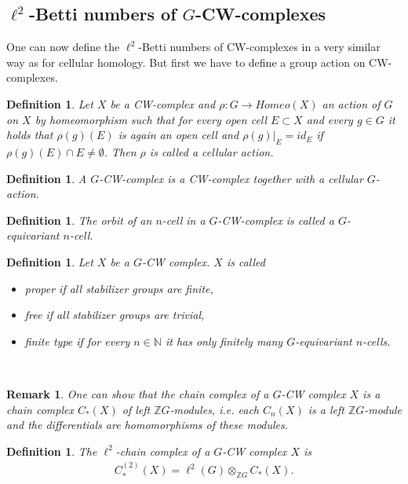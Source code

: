 \documentclass[12pt,a4paper]{scrartcl}
\newtheorem{Definition}[Theorem]{Definition}
\newtheorem{Remark}[Theorem]{Remark}
\numberwithin{equation}{section}
\newcommand{\Z}{\mathbb{Z}} %
\newcommand{\N}{\mathbb{N}} %
\newcommand{\2}{\mathbb{Z} / 2 \mathbb{Z}}
\newcommand{\1}{\bar{1}}
\newcommand{\0}{\bar{0}}
\begin{document}
\subsection{$\ell^2$-Betti numbers of $G$-CW-complexes}
One can now define the $\ell^2$-Betti numbers of CW-complexes in a very similar way as for cellular homology. But first we have to define a group action on CW-complexes.
\begin{Definition}
	Let $X$ be a CW-complex and $\rho: G \to Homeo(X)$ an action of $G$ on $X$ by homeomorphism such that for every open cell $E \subset X$ and every $g \in G$ it holds that $\rho(g)(E)$ is again an open cell and $\rho(g)|_{E} = id_E$ if $\rho(g)(E) \cap E \neq \emptyset$. Then $\rho$ is called a \emph{cellular action}.
\end{Definition}

\begin{Definition}
	A \emph{$G$-CW-complex} is a CW-complex together with a cellular $G$-action.
\end{Definition}

\begin{Definition}
	The \emph{orbit} of an $n$-cell in a $G$-CW-complex is called a $G$-equivariant $n$-cell.
\end{Definition}

\begin{Definition}
	Let $X$ be a $G$-CW complex. $X$ is called
	\begin{itemize}
		\item \emph{proper} if all stabilizer groups are finite,
		\item \emph{free} if all stabilizer groups are trivial,
		\item \emph{finite type} if for every $n \in \N$ it has only finitely many $G$-equivariant $n$-cells.
	\end{itemize}
\end{Definition}
\
\begin{Remark}
	One can show that the chain complex of a $G$-CW complex $X$ is a chain complex $C_*(X)$ of left $\Z G$-modules, i.e. each $C_n(X)$ is a left $\Z G$-module and the differentials are homomorphisms of these modules.
\end{Remark}
\begin{Definition}
	The \emph{$\ell^2$-chain complex} of a $G$-CW complex $X$ is
	\begin{align*}
		C_*^{(2)}(X) = \ell^2(G) \otimes_{\Z G} C_*(X).
	\end{align*}
\end{Definition}
\end{document}
